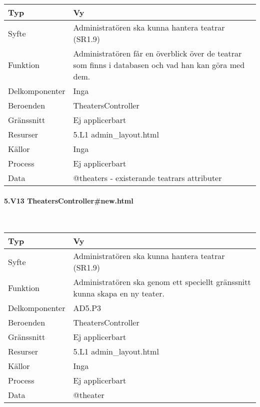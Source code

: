 \documentclass[a4paper, twoside, 11pt, titlepage]{article}
\begin{document}
			\begin {table} [ht] \begin{tabular} {  p{3.5cm} p{9.6cm} }
				\hline
				Typ & Vy  \\
				\hline
				Syfte & Administratören ska kunna hantera teatrar (SR1.9)  \\
				\hline
				Funktion & Administratören får en överblick över de teatrar som finns i databasen och vad han kan göra med dem.  \\
				\hline
				Delkomponenter & Inga  \\
				\hline
				Beroenden & TheatersController  \\
				\hline
				Gränssnitt & Ej applicerbart  \\
				\hline
				Resurser & 5.L1 admin\_layout.html  \\
				\hline
				Källor & Inga  \\
				\hline
				Process & Ej applicerbart  \\
				\hline
				Data & @theaters - existerande teatrars attributer   \\
				\hline
			\end{tabular} \end{table} \FloatBarrier


			\paragraph{5.V13 TheatersController\#new.html}\

			\begin {table} [ht] \begin{tabular} {  p{3.5cm} p{9.6cm} }
				\hline
				Typ & Vy  \\
				\hline
				Syfte & Administratören ska kunna hantera teatrar (SR1.9)  \\
				\hline
				Funktion & Administratören ska genom ett speciellt gränssnitt kunna skapa en ny teater.  \\
				\hline
				Delkomponenter & AD5.P3  \\
				\hline
				Beroenden & TheatersController  \\
				\hline
				Gränssnitt & Ej applicerbart  \\
				\hline
				Resurser & 5.L1 admin\_layout.html  \\
				\hline
				Källor & Inga  \\
				\hline
				Process & Ej applicerbart  \\
				\hline
				Data & @theater  \\
				\hline
			\end{tabular} \end{table} \FloatBarrier
\end{document}

